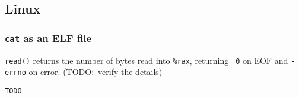 \subsection{Linux}
\subsubsection{{\tt cat} as an ELF file}
{\tt read()} returns the number of bytes read into \verb|%rax|, returning {\tt
0} on EOF and {\tt -errno} on error. (TODO:~verify the details)

\begin{verbatim}
TODO
\end{verbatim}
